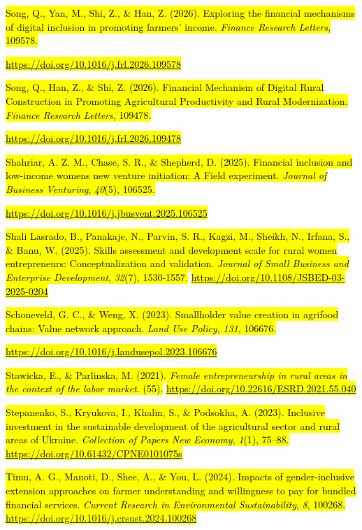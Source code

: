 \hl{Song, Q., Yan, M., Shi, Z., \& Han, Z. (2026). Exploring the
financial mechanisms of digital inclusion in promoting farmers' income.
\emph{Finance Research Letters}, 109578.}

\href{https://doi.org/10.1016/j.frl.2026.109578}{\hl{https://doi.org/10.1016/j.frl.2026.109578}}

\hl{Song, Q., Han, Z., \& Shi, Z. (2026). Financial Mechanism of Digital
Rural Construction in Promoting Agricultural Productivity and Rural
Modernization. \emph{Finance Research Letters}, 109478.}

\href{https://doi.org/10.1016/j.frl.2026.109478}{\hl{https://doi.org/10.1016/j.frl.2026.109478}}

\hl{Shahriar, A. Z. M., Chase, S. R., \& Shepherd, D. (2025). Financial
inclusion and low-income women\textquotesingle s new venture initiation:
A Field experiment. \emph{Journal of Business Venturing}, \emph{40}(5),
106525.}

\href{https://doi.org/10.1016/j.jbusvent.2025.106525}{\hl{https://doi.org/10.1016/j.jbusvent.2025.106525}}

\hl{Shali Lasrado, B., Panakaje, N., Parvin, S. R., Kagzi, M., Sheikh,
N., Irfana, S., \& Banu, W. (2025). Skills assessment and development
scale for rural women entrepreneurs: Conceptualization and validation.
\emph{Journal of Small Business and Enterprise Development},
\emph{32}(7), 1530-1557.}
\href{https://doi.org/10.1108/JSBED-03-2025-0204}{\hl{https://doi.org/10.1108/JSBED-03-2025-0204}}

\hl{Schoneveld, G. C., \& Weng, X. (2023). Smallholder value creation in
agrifood chains: Value network approach. \emph{Land Use Policy},
\emph{131}, 106676.}

\href{https://doi.org/10.1016/j.landusepol.2023.106676}{\hl{https://doi.org/10.1016/j.landusepol.2023.106676}}

\hl{Stawicka, E., \& Parlinska, M. (2021). \emph{Female entrepreneurship
in rural areas in the context of the labor market.} (55).}
\href{https://doi.org/10.22616/ESRD.2021.55.040}{\hl{https://doi.org/10.22616/ESRD.2021.55.040}}

\hl{Stepanenko, S., Kryukova, I., Khalin, S., \& Podsokha, A. (2023).
Inclusive investment in the sustainable development of the agricultural
sector and rural areas of Ukraine. \emph{Collection of Papers New
Economy}, \emph{1}(1), 75--88.}
\href{https://doi.org/10.61432/CPNE0101075s}{\hl{https://doi.org/10.61432/CPNE0101075s}}

\hl{Timu, A. G., Manoti, D., Shee, A., \& You, L. (2024). Impacts of
gender-inclusive extension approaches on farmer understanding and
willingness to pay for bundled financial services. \emph{Current
Research in Environmental Sustainability}, \emph{8}, 100268.
\mbox{\url{https://doi.org/10.1016/j.crsust.2024.100268}}}

